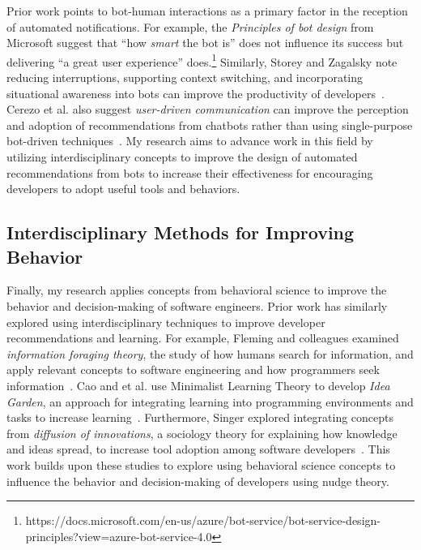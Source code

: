 Prior work points to bot-human interactions as a primary factor in the reception of automated notifications. For example, the \textit{Principles of bot design} from Microsoft suggest that ``how \textit{smart} the bot is'' does not influence its success but delivering ``a great user experience'' does.\footnote{https://docs.microsoft.com/en-us/azure/bot-service/bot-service-design-principles?view=azure-bot-service-4.0} Similarly, Storey and Zagalsky note reducing interruptions, supporting context switching, and incorporating situational awareness into bots can improve the productivity of developers~\cite{storey2016bots}. Cerezo et al. also suggest \textit{user-driven communication} can improve the perception and adoption of recommendations from chatbots rather than using single-purpose bot-driven techniques~\cite{cerezo2019building}. My research aims to advance work in this field by utilizing interdisciplinary concepts to improve the design of automated recommendations from bots to increase their effectiveness for encouraging developers to adopt useful tools and behaviors.


\subsection{Interdisciplinary Methods for Improving Behavior}

Finally, my research applies concepts from behavioral science to improve the behavior and decision-making of software engineers. Prior work has similarly explored using interdisciplinary techniques to improve developer recommendations and learning. For example, Fleming and colleagues examined \textit{information foraging theory}, the study of how humans search for information, and apply relevant concepts to software engineering and how programmers seek information~\cite{fleming2013information}. Cao and et al. use Minimalist Learning Theory to develop \textit{Idea Garden}, an approach for integrating learning into programming environments and tasks to increase learning~\cite{cao2012ideagarden}. Furthermore, Singer explored integrating concepts from \textit{diffusion of innovations}, a sociology theory for explaining how knowledge and ideas spread, to increase tool adoption among software developers~\cite{Diffusion}. This work builds upon these studies to explore using behavioral science concepts to influence the behavior and decision-making of developers using nudge theory. 


